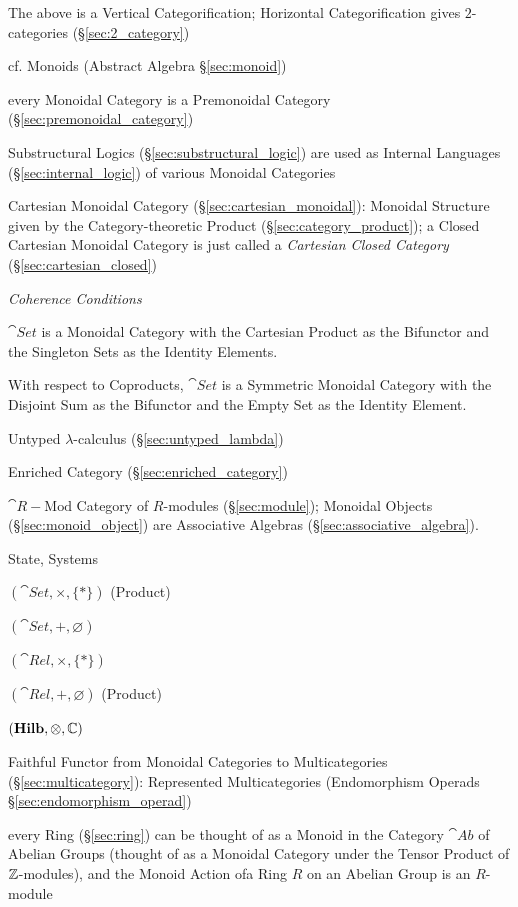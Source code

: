 The above is a Vertical Categorification; Horizontal Categorification
gives $2$-categories (\S\ref{sec:2_category})

\fist cf. Monoids (Abstract Algebra \S\ref{sec:monoid})

every Monoidal Category is a Premonoidal Category
(\S\ref{sec:premonoidal_category})

\fist Substructural Logics (\S\ref{sec:substructural_logic}) are used
as Internal Languages (\S\ref{sec:internal_logic}) of various Monoidal
Categories

\fist Cartesian Monoidal Category (\S\ref{sec:cartesian_monoidal}): Monoidal
Structure given by the Category-theoretic Product
(\S\ref{sec:category_product}); a Closed Cartesian Monoidal Category is just
called a \emph{Cartesian Closed Category} (\S\ref{sec:cartesian_closed})

\emph{Coherence Conditions}

$\cat{Set}$ is a Monoidal Category with the Cartesian Product as
the Bifunctor and the Singleton Sets as the Identity Elements.

With respect to Coproducts, $\cat{Set}$ is a Symmetric Monoidal
Category with the Disjoint Sum as the Bifunctor and the Empty
Set as the Identity Element.

Untyped $\lambda$-calculus (\S\ref{sec:untyped_lambda})

Enriched Category (\S\ref{sec:enriched_category})

$\cat{R-\text{Mod}}$ Category of $R$-modules (\S\ref{sec:module});
Monoidal Objects (\S\ref{sec:monoid_object}) are Associative Algebras
(\S\ref{sec:associative_algebra}).

State, Systems %

$(\cat{Set}, \times, \{*\})$ (Product)

$(\cat{Set}, +, \varnothing)$

$(\cat{Rel}, \times, \{*\})$

$(\cat{Rel}, +, \varnothing)$ (Product)

$(\mathbf{Hilb}, \otimes, \mathbb{C})$

Faithful Functor from Monoidal Categories to Multicategories
(\S\ref{sec:multicategory}): Represented Multicategories (Endomorphism
Operads \S\ref{sec:endomorphism_operad})

every Ring (\S\ref{sec:ring}) can be thought of as a Monoid in the Category
$\cat{Ab}$ of Abelian Groups (thought of as a Monoidal Category under the
Tensor Product of $\mathbb{Z}$-modules), and the Monoid Action ofa Ring $R$ on an
Abelian Group is an $R$-module



